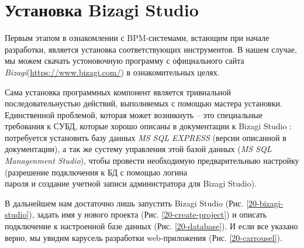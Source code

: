 \chapter{Установка Bizagi Studio}

Первым этапом в ознакомлении с BPM-системами, встающим при начале разработки,
является установка соответствующих инструментов. В нашем случае, мы
можем скачать устоновочную программу с официального сайта
\textit{Bizagi}(\url{https://www.bizagi.com/}) в ознакомительных целях.

Сама установка программных компонент является тривиальной последовательнустью
действий, выполняемых с помощью мастера установки. Единственной проблемой,
которая может возникнуть -- это специальные требования к СУБД, которые
хорошо описаны в документации к Bizagi Studio
\cite[SQL Server requisites]{sql-requisites}: потребуется установить базу
данных \textit{MS SQL EXPRESS} (версии описанной в документации), а так же
сустему управления этой базой данных (\textit{MS SQL Managenment Studio}),
чтобы провести необходимую предварительныю настройку (разрешение подключения к БД
с помощью логина\\пароля и создание учетной записи администратора для Bizagi Studio).

В дальнейшем нам достаточно лишь запустить Bizagi Studio (Рис. \ref{20-bizagi-studio}),
задать имя у нового проекта (Рис. \ref{20-create-project}) и описать подключение
к настроенной базе данных (Рис. \ref{20-database}). И если все указано верно,
мы увидим карусель разработки web-приложения (Рис. \ref{20-carrousel}).


